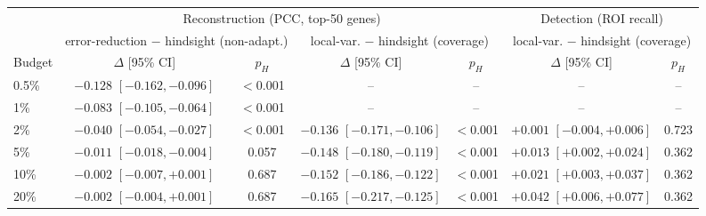 \begin{tabular}{lcccccc}
\toprule
 & \multicolumn{4}{c}{Reconstruction (PCC, top-50 genes)} & \multicolumn{2}{c}{Detection (ROI recall)} \\
\cmidrule(lr){2-5}\cmidrule(lr){6-7}
 & \multicolumn{2}{c}{error-reduction $-$ hindsight (non-adapt.)} & \multicolumn{2}{c}{local-var. $-$ hindsight (coverage)} & \multicolumn{2}{c}{local-var. $-$ hindsight (coverage)} \\
\cmidrule(lr){2-3}\cmidrule(lr){4-5}\cmidrule(lr){6-7}
Budget & $\Delta$ [95\% CI] & $p_H$ & $\Delta$ [95\% CI] & $p_H$ & $\Delta$ [95\% CI] & $p_H$ \\
\midrule
0.5\% & $-0.128$ $[-0.162, -0.096]$ & $<$0.001 & -- & -- & -- & -- \\
1\% & $-0.083$ $[-0.105, -0.064]$ & $<$0.001 & -- & -- & -- & -- \\
2\% & $-0.040$ $[-0.054, -0.027]$ & $<$0.001 & $-0.136$ $[-0.171, -0.106]$ & $<$0.001 & ${+}0.001$ $[-0.004, {+}0.006]$ & 0.723 \\
5\% & $-0.011$ $[-0.018, -0.004]$ & 0.057 & $-0.148$ $[-0.180, -0.119]$ & $<$0.001 & ${+}0.013$ $[{+}0.002, {+}0.024]$ & 0.362 \\
10\% & $-0.002$ $[-0.007, {+}0.001]$ & 0.687 & $-0.152$ $[-0.186, -0.122]$ & $<$0.001 & ${+}0.021$ $[{+}0.003, {+}0.037]$ & 0.362 \\
20\% & $-0.002$ $[-0.004, {+}0.001]$ & 0.687 & $-0.165$ $[-0.217, -0.125]$ & $<$0.001 & ${+}0.042$ $[{+}0.006, {+}0.077]$ & 0.362 \\
\bottomrule
\end{tabular}